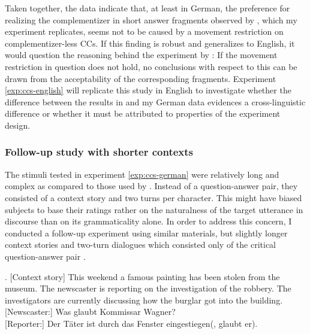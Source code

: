 Taken together, the data indicate that, at least in German, the preference for realizing the complementizer in short answer fragments observed by \citet{merchant.etal2013}, which my experiment replicates, seems not to be caused by a movement restriction on complementizer-less CCs. If this finding is robust and generalizes to English, it would question the reasoning behind the experiment by \citet{merchant.etal2013}: If the movement restriction in question does not hold, no conclusions with respect to this can be drawn from the acceptability of the corresponding fragments. Experiment \ref{exp:ccs-english} will replicate this study in English to investigate whether the difference between the results in \citet{merchant.etal2013} and my German data evidences a cross-linguistic difference or whether it must be attributed to properties of the experiment design.

\subsubsection{Follow-up study with shorter contexts}

The stimuli tested in experiment \ref{exp:ccs-german} were relatively long and complex as compared to those used by \citet{merchant.etal2013}. Instead of a question-answer pair, they consisted of a context story and two turns per character. This might have biased subjects to base their ratings rather on the naturalness of the target utterance in discourse than on its grammaticality alone. In order to address this concern, I conducted a follow-up experiment using similar materials, but slightly longer context stories and two-turn dialogues which consisted only of the critical question-answer pair \Next.

\ex. [Context story] This weekend a famous painting has been stolen from the museum. The newscaster is reporting on the investigation of the robbery. The investigators are currently discussing how the burglar got into the building.\\\mbox{}[Newscaster:] Was glaubt Kommissar Wagner?\\\mbox{}[Reporter:]  Der Täter ist durch das Fenster eingestiegen(, glaubt er).

